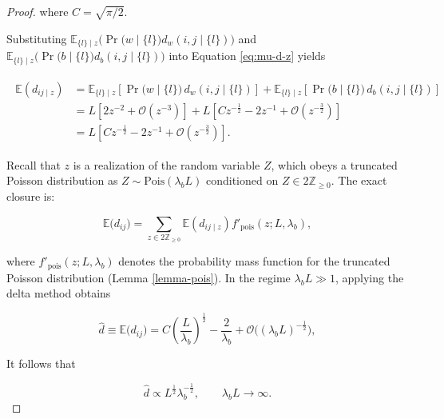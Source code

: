 \documentclass[11pt, class=article, crop=false]{standalone}
\theoremstyle{definition}
\begin{document}
\begin{proof}
where $C = \sqrt{\pi/2}$.

Substituting $\mathbb{E}_{\{l\} \mid z}\bigl( \Pr \bigl(w \mid \{l\}\bigr) d_w(i,j \mid \{l\}) \bigr)$ and $\mathbb{E}_{\{l\} \mid z}\bigl(\Pr \bigl(b \mid \{l\}\bigr) d_b(i, j \mid \{l\})\bigr)$ into Equation \ref{eq:mu-d-z} yields

\begin{align}
\begin{split}
    \mathbb{E}(d_{ij \mid z}) 
    &= 
    \mathbb{E}_{\{l\}\mid z}
    \left[
        \Pr \bigl(w \mid \{l\} \bigr)\, d_w(i,j \mid \{l\})
    \right]
    +
    \mathbb{E}_{\{l\} \mid z}
    \left[
        \Pr \bigl(b \mid \{l\} \bigr)\, d_b(i,j \mid \{l\})
    \right]\\
    &= 
    L\left[2z^{-2} + 
    \mathcal{O}(z^{-3})\right] +
    L
    \left[
        C z^{-\frac{1}{2}} - 2z^{-1} + \mathcal{O}(z^{-\frac{3}{2}})
    \right]\\
    &= 
    L \left[Cz^{-\frac{1}{2}} - 2z^{-1}  + \mathcal{O}(z^{-\frac{3}{2}}) \right].
\end{split}
\end{align}

Recall that $z$ is a realization of the random variable $Z$, which obeys a truncated Poisson distribution as $Z \sim \text{Pois}(\lambda_b L)$ conditioned on $Z \in 2\mathbb{Z}_{\ge0}$.
The exact closure is:

\begin{equation}
    \mathbb{E}\bigl(d_{ij}\bigr) = \sum_{z \in 2\mathbb{Z}_{\ge 0}} \mathbb{E}(d_{ij \mid z}) f'_{\text{pois}}(z; L, \lambda_b),
\end{equation}

where $f'_{\text{pois}}(z; L, \lambda_b)$ denotes the probability mass function for the truncated Poisson distribution (Lemma \ref{lemma-pois}).
In the regime $\lambda_b L \gg 1$, applying the delta method obtains

\begin{equation}
\hat{d} \equiv \mathbb{E}\bigl(d_{ij}\bigr) = C\left(\frac{L}{\lambda_b}\right)^{\frac{1}{2}} - \frac{2}{\lambda_b} +  \mathcal{O}\bigl((\lambda_b L)^{-\frac{1}{2}}\bigr),
\end{equation}

It follows that

\begin{equation}
    \hat{d}
    \propto
    L^{\frac{1}{2}}\lambda_b^{-\frac{1}{2}},
    \qquad
    \lambda_b L \to \infty.
\end{equation}

\end{proof}
\end{document}
